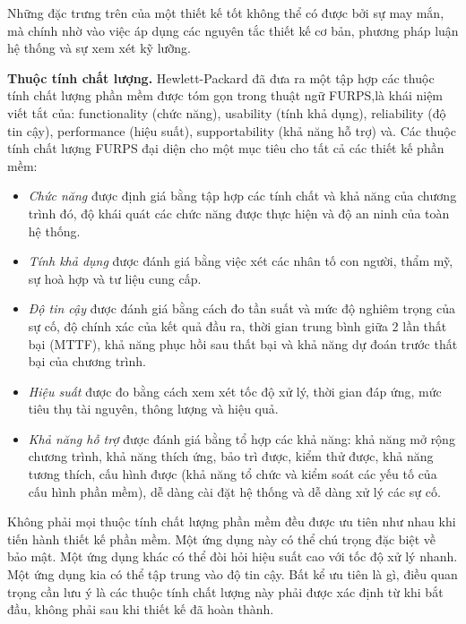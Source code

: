 \documentclass[./../SoftwareEngineering.tex]{subfiles}
\begin{document}
	Những đặc trưng trên của một thiết kế tốt không thể có được bởi sự may mắn, mà chính nhờ vào việc áp dụng các nguyên tắc thiết kế cơ bản, phương pháp luận hệ thống và sự xem xét kỹ lưỡng.
	
	
	\textbf{Thuộc tính chất lượng.} Hewlett-Packard \cites{Gra87} đã đưa ra một tập hợp các thuộc tính chất lượng phần mềm được tóm gọn trong thuật ngữ \acrshort{FURPS},là khái niệm viết tắt của: functionality (chức năng), usability (tính khả dụng), reliability (độ tin cậy), performance (hiệu suất), supportability (khả năng hỗ trợ) và. Các thuộc tính chất lượng \acrshort{FURPS} đại diện cho một mục tiêu cho tất cả các thiết kế phần mềm:
	\begin{itemize}
		\item \textit{Chức năng} được định giá bằng tập hợp các tính chất và khả năng của chương trình đó, độ khái quát các chức năng được thực hiện và độ an ninh của toàn hệ thống.
		\item \textit{Tính khả dụng}  được đánh giá bằng việc xét các nhân tố con người, thẩm mỹ, sự hoà hợp và tư liệu cung cấp. 
		\item \textit{Độ tin cậy} được đánh giá bằng cách đo tần suất và mức độ nghiêm trọng của sự cố, độ chính xác của kết quả đầu ra, thời gian trung bình giữa 2 lần thất bại (\acrshort{MTTF}), khả năng phục hồi sau thất bại và khả năng dự đoán trước thất bại của chương trình. 
		\item \textit{Hiệu suất} được đo bằng cách xem xét tốc độ xử lý, thời gian đáp ứng, mức tiêu thụ tài nguyên, thông lượng và hiệu quả. 
		\item \textit{Khả năng hỗ trợ} được đánh giá bằng tổ hợp các khả năng: khả năng mở rộng chương trình, khả năng thích ứng, bảo trì được, kiểm thử được, khả năng tương thích, cấu hình được (khả năng tổ chức và kiểm soát các yếu tố của cấu hình phần mềm), dễ dàng cài đặt hệ thống và dễ dàng xử lý các sự cố.
	\end{itemize}
	Không phải mọi thuộc tính chất lượng phần mềm đều được ưu tiên như nhau khi tiến hành thiết kế phần mềm. Một ứng dụng này có thể chú trọng đặc biệt về bảo mật. Một ứng dụng khác có thể đòi hỏi hiệu suất cao với  tốc độ xử lý nhanh. Một ứng dụng kia có thể tập trung vào độ tin cậy. Bất kể ưu tiên là gì, điều quan trọng cần lưu ý là các thuộc tính chất lượng này phải được xác định từ khi bắt đầu, không phải sau khi thiết kế đã  hoàn thành.
\end{document}
